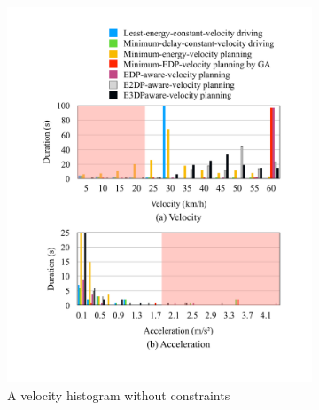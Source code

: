 \documentclass[onecolumn]{IEEEconf}
\begin{document}
\begin{description}
\begin{figure}[h!]
\begin{subfigure}{0.45\textwidth}
	\includegraphics[width=\hsize]{Figures/Histogram_noconst_vel.pdf}
	\caption{A velocity histogram without constraints}
	\label{fig:histogram_noconst_vel}
	\end{subfigure}
	\begin{subfigure}{0.45\textwidth}

\end{subfigure}
\end{figure}
\end{description}
\end{document}
